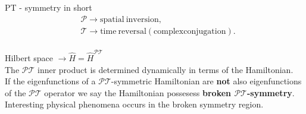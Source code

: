 \documentclass[10pt]{beamer}
\begin{document}
\begin{frame}{PT - symmetry in short}
    \vspace{-1cm}
    \begin{align*}
        & \mathcal{P} \rightarrow \mathrm{spatial\:inversion},\\
        & \mathcal{T} \rightarrow \mathrm{time\:reversal (complex conjugation)}.
    \end{align*}\\
    \vspace{0.5cm}
    Hilbert space $\rightarrow \hat{H} = \hat{H}^{\mathcal{PT}}$ \\
    \vspace{0.5cm}
    \pause
    The $\mathcal{PT}$ inner product is determined dynamically in terms of the Hamiltonian.\\
    \pause
    \vspace{0.5cm}
    If the eigenfunctions of a $\mathcal{PT}$-symmetric Hamiltonian are \textbf{not} also eigenfunctions of the $\mathcal{PT}$ operator we say the Hamiltonian possesess \textbf{broken $\mathcal{PT}$-symmetry}.\\
    \pause
    \vspace{0.5cm}
    Interesting physical phenomena occurs in the broken symmetry region.
\end{frame}
\end{document}

